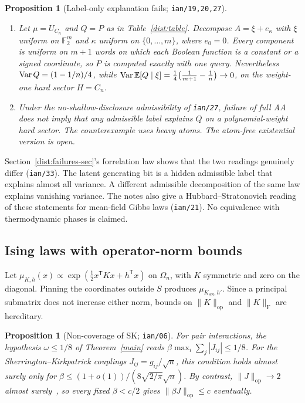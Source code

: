 \documentclass[11pt]{article}
\newtheorem{proposition}[theorem]{Proposition}
\theoremstyle{definition}\newtheorem{definition}[theorem]{Definition}
\theoremstyle{remark}\newtheorem{remark}[theorem]{Remark}
\newcommand{\E}{\mathbb E}\newcommand{\Prb}{\mathbb P}
\begin{document}
\begin{proposition}[Label-only explanation fails; \texttt{ian/19,20,27}]\label{dist:label-only-fails}
\leavevmode
\begin{enumerate}
\item Let \(\mu=U_{C_n}\) and \(Q=P\) as in Table~\ref{dist:table}. Decompose
\(A=\xi+e_\kappa\) with \(\xi\) uniform on \(\mathbb F_2^m\) and \(\kappa\)
uniform on \(\{0,\dots,m\}\), where \(e_0=0\). Every component is uniform on
\(m+1\) words on which each Boolean function is a constant or a signed
coordinate, so \(P\) is computed exactly with one query. Nevertheless
\(\operatorname{Var} Q=(1-1/n)/4\), while
\(\Var\E[Q\mid\xi]=\tfrac14\bigl(\tfrac1{m+1}-\tfrac1n\bigr)\to0\), on the
weight-one hard sector \(H=C_n\).
\item Under the no-shallow-disclosure admissibility of \texttt{ian/27},
failure of full AA does not imply that any admissible label explains \(Q\) on a
polynomial-weight hard sector. The counterexample uses heavy atoms. The
atom-free existential version is \emph{open}.
\end{enumerate}
\end{proposition}
Section~\ref{dist:failures-sec}'s forrelation law shows that the two readings
genuinely differ (\texttt{ian/33}). The latent generating bit is a hidden
admissible label that explains almost all variance. A different admissible
decomposition of the same law explains vanishing variance. The notes also give
a Hubbard--Stratonovich reading of these statements for mean-field Gibbs laws
(\texttt{ian/21}). No equivalence with thermodynamic phases is claimed.

\subsection{Ising laws with operator-norm bounds}\label{dist:spectral}
Let \(\mu_{K,h}(x)\propto\exp(\tfrac12x^{\mathsf T}Kx+h^{\mathsf T}x)\) on
\(\Omega_n\), with \(K\) symmetric and zero on the diagonal. Pinning the
coordinates outside \(S\) produces \(\mu_{K_{SS},h'}\). Since a principal
submatrix does not increase either norm, bounds on \(\|K\|_{\mathrm{op}}\) and
\(\|K\|_{\mathrm F}\) are hereditary.

\begin{proposition}[Non-coverage of SK; \texttt{ian/06}]\label{dist:sk-noncoverage}
For pair interactions, the hypothesis \(\omega\le1/8\) of
Theorem~\ref{main} reads \(\beta\max_i\sum_j|J_{ij}|\le1/8\). For the Sherrington--Kirkpatrick couplings
\(J_{ij}=g_{ij}/\sqrt n\), this condition holds almost surely only for
\(\beta\le(1+o(1))/(8\sqrt{2/\pi}\sqrt n)\). By contrast,
\(\|J\|_{\mathrm{op}}\to2\) almost surely~\cite{FK81,BY88}, so every fixed
\(\beta<c/2\) gives \(\|\beta J\|_{\mathrm{op}}\le c\) eventually.
\end{proposition}
\end{document}
